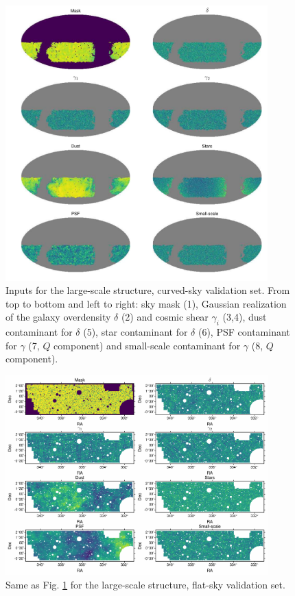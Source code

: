 \documentclass[usenatbib]{mnrasb}
\begin{document}
        \begin{figure}
          \centering
          \includegraphics[width=0.9\textwidth]{maps_lss_sph}
          \caption{Inputs for the large-scale structure, curved-sky validation set. From top to bottom and left to right: sky mask (1), Gaussian realization of the galaxy overdensity $\delta$ (2) and cosmic shear $\gamma_i$ (3,4), dust contaminant for $\delta$ (5), star contaminant for $\delta$ (6), PSF contaminant for $\gamma$ (7, $Q$ component) and small-scale contaminant for $\gamma$ (8, $Q$ component).}
          \label{fig:lss_mocks_sph}
        \end{figure}
        \begin{figure}
          \centering
          \includegraphics[width=0.9\textwidth]{maps_lss_flat}
          \caption{Same as Fig. \ref{fig:lss_mocks_sph} for the large-scale structure, flat-sky validation set.}
          \label{fig:lss_mocks_flat}
        \end{figure}
\end{document}

